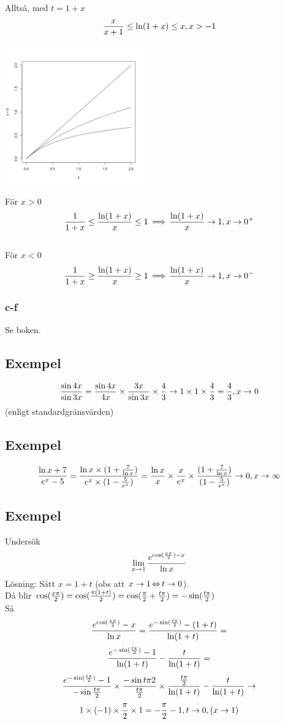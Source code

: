 \documentclass{article}
\begin{document}
Alltså, med $t=1+x$
$$ \frac{x}{x+1} \le \ln(1+x) \le x, x>-1 $$

\includegraphics[height=60mm, width=60mm]{img/lntt1.png}

För $x>0$
$$ \frac{1}{1+x} \le \frac{\ln(1+x)}{x} \le 1 \operatorname{\implies} \frac{\ln(1+x)}{x} \to 1, x\to 0^+ $$\\
För $x<0$
$$ \frac{1}{1+x} \ge \frac{\ln(1+x)}{x} \ge 1 \operatorname{\implies} \frac{\ln(1+x)}{x} \to 1, x\to 0^- $$

\subsubsection{c-f}
Se boken.

\subsection{Exempel}
$$ \frac{\sin 4x}{\sin 3x} = \frac{\sin 4x}{4x} \times \frac{3x}{\sin 3x} \times \frac{4}{3} \to 1\times 1\times \frac{4}{3} = \frac{4}{3}, x\to 0 $$
(enligt standardgränsvärden)

\subsection{Exempel}
$$ \frac{\ln x + 7}{e^x - 5} = \frac{\ln x \times (1 + \frac{7}{\ln x})}{e^x\times (1-\frac{5}{e^x})} =
\frac{\ln x}{x} \times \frac{x}{e^x} \times \frac{(1 + \frac{7}{\ln x})}{(1-\frac{5}{e^x})} \to 0, x\to\infty$$

\subsection{Exempel}
Undersök
$$ \displaystyle \lim_{x \rightarrow 1} \frac{ e^{\cos(\frac{x\pi}{2}) - x} }{ \ln x } $$
Lösning: Sätt $x = 1+t$ (obs att $x\to 1 \operatorname{\Leftrightarrow} t\to 0$).\\
Då blir $\cos(\frac{x\pi}{2}) = \cos(\frac{\pi (1+t)}{2}) = \cos(\frac{\pi}{2} + \frac{t\pi}{2}) = -\sin(\frac{t\pi}{2})$\\
Så
$$
\frac{e^{\cos(\frac{x\pi}{2})} - x}{\ln x} = \frac{e^{-\sin(\frac{t\pi}{2})} - (1+t)}{\ln (1+t)} =
$$
$$
\frac{e^{-\sin(\frac{t\pi}{2})} - 1}{\ln (1+t)} - \frac{t}{\ln(1+t)}=
$$
$$
\frac{e^{-\sin(\frac{t\pi}{2})} - 1}{-\sin{\frac{t\pi}{2}}} \times \frac{-\sin{t\pi}2}{\frac{t\pi}{2}} \times \frac{\frac{t\pi}{2}}{\ln(1+t)} - \frac{t}{\ln(1+t)} \to
$$
$$
1 \times (-1)\times \frac{\pi}{2} \times 1 = -\frac{\pi}{2} - 1, t\to 0, (x\to 1)
$$
\end{document}
